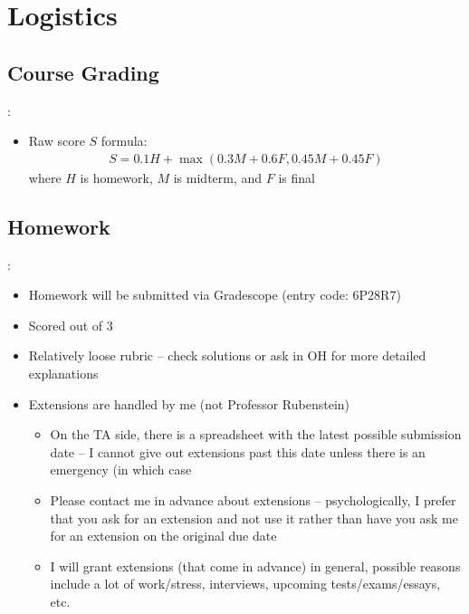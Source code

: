 \documentclass{../slides}
\begin{document}
\section{Logistics}
\subsection{Course Grading}
\begin{frame}{\secname: \subsecname}
    \begin{itemize}
        \item Raw score $S$ formula:
        \begin{gather*}
            S = 0.1H + \max{\left(0.3M + 0.6F, 0.45M + 0.45F\right)} 
        \end{gather*}
        where $H$ is homework, $M$ is midterm, and $F$ is final
    \end{itemize}
\end{frame}

\subsection{Homework}
\begin{frame}{\secname: \subsecname}
    \begin{itemize}
        \item Homework will be submitted via Gradescope (entry code: 6P28R7)
        \item Scored out of $3$
        \item Relatively loose rubric -- check solutions or ask in OH for more detailed explanations
        \item Extensions are handled by me (not Professor Rubenstein)
        \begin{itemize}
            \item On the TA side, there is a spreadsheet with the latest possible submission date -- I cannot give out extensions past this date unless there is an emergency (in which case 
            \item Please contact me in advance about extensions -- psychologically, I prefer that you ask for an extension and not use it rather than have you ask me for an extension on the original due date
            \item I will grant extensions (that come in advance) in general, possible reasons include a lot of work/stress, interviews, upcoming tests/exams/essays, etc.
        \end{itemize}
    \end{itemize}
\end{frame}
\end{document}
